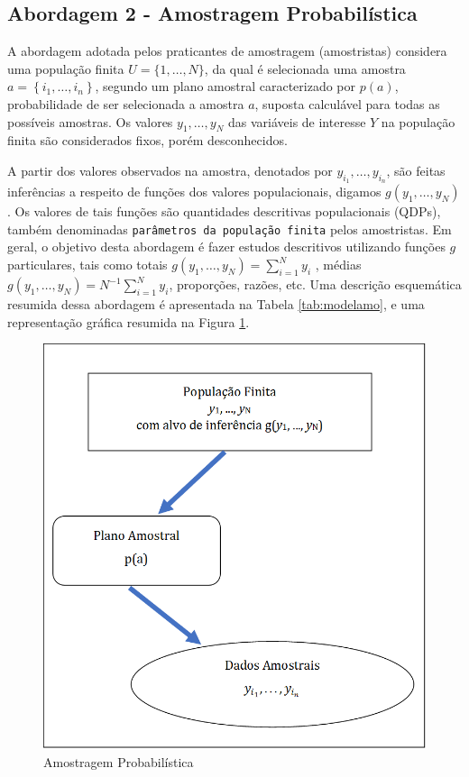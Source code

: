 \documentclass[]{book}
\theoremstyle{definition}
\theoremstyle{definition}
\theoremstyle{definition}
\theoremstyle{remark}
\begin{document}
\subsection{Abordagem 2 - Amostragem
Probabilística}\label{abordagem-2---amostragem-probabilistica}

A abordagem adotada pelos praticantes de amostragem (amostristas)
considera uma população finita \(U=\{1,\ldots ,N\}\), da qual é
selecionada uma amostra \(a=\left\{ i_{1},\ldots ,i_{n}\right\}\),
segundo um plano amostral caracterizado por \(p\left( a\right)\),
probabilidade de ser selecionada a amostra \(a\), suposta calculável
para todas as possíveis amostras. Os valores \(y_{1},\ldots ,y_{N}\) das
variáveis de interesse \(Y\) na população finita são considerados fixos,
porém desconhecidos. \textbar{}

A partir dos valores observados na amostra, denotados por
\(y_{i_1}, \ldots, y_{i_n}\), são feitas inferências a respeito de
funções dos valores populacionais, digamos
\(g\left( y_{1}, \ldots , y_{N}\right)\). Os valores de tais funções são
quantidades descritivas populacionais (QDPs), também denominadas
\texttt{parâmetros\ da\ população\ finita} pelos amostristas. Em geral,
o objetivo desta abordagem é fazer estudos descritivos utilizando
funções \(g\) particulares, tais como totais
\(g\left( y_{1}, \ldots , y_{N}\right) = \sum_{i=1}^{N} y_{i}\) , médias
\(g\left( y_{1}, \ldots , y_{N}\right) = N^{-1}\sum_{i=1}^{N} y_{i}\),
proporções, razões, etc. Uma descrição esquemática resumida dessa
abordagem é apresentada na Tabela \ref{tab:modelamo}, e uma
representação gráfica resumida na Figura \ref{fig:modamo}.

\begin{figure}
\centering
\includegraphics{Figuras/Figura2.2.png}
\caption{\label{fig:modamo}Amostragem Probabilística}
\end{figure}
\end{document}
